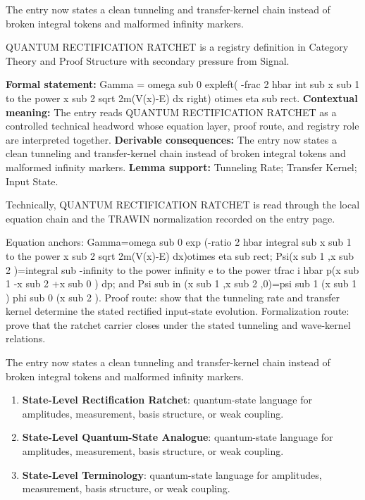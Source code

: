 The entry now states a clean tunneling and transfer-kernel chain instead of broken integral tokens and malformed infinity markers.
\clearpage


\begingroup\small
{}
QUANTUM RECTIFICATION RATCHET is a registry definition in Category Theory and Proof Structure with secondary pressure from Signal.

\begingroup\footnotesize\setlength{\emergencystretch}{3em}\sloppy
\textbf{Formal statement:} Gamma = omega sub 0 expleft( -frac 2 hbar int sub x sub 1 to the power x sub 2 sqrt 2m(V(x)-E) dx right) otimes eta sub rect. \textbf{Contextual meaning:} The entry reads QUANTUM RECTIFICATION RATCHET as a controlled technical headword whose equation layer, proof route, and registry role are interpreted together. \textbf{Derivable consequences:} The entry now states a clean tunneling and transfer-kernel chain instead of broken integral tokens and malformed infinity markers. \textbf{Lemma support:} Tunneling Rate; Transfer Kernel; Input State.\par
\endgroup

Technically, QUANTUM RECTIFICATION RATCHET is read through the local equation chain and the TRAWIN normalization recorded on the entry page.

Equation anchors: Gamma=omega sub 0 exp (-ratio 2 hbar integral sub x sub 1 to the power x sub 2 sqrt 2m(V(x)-E) dx)otimes eta sub rect; Psi(x sub 1 ,x sub 2 )=integral sub -infinity to the power infinity e to the power tfrac i hbar p(x sub 1 -x sub 2 +x sub 0 ) dp; and Psi sub in (x sub 1 ,x sub 2 ,0)=psi sub 1 (x sub 1 ) phi sub 0 (x sub 2 ). Proof route: show that the tunneling rate and transfer kernel determine the stated rectified input-state evolution. Formalization route: prove that the ratchet carrier closes under the stated tunneling and wave-kernel relations.

The entry now states a clean tunneling and transfer-kernel chain instead of broken integral tokens and malformed infinity markers.
\endgroup

\begin{enumerate}[leftmargin=1.6em,itemsep=6pt,topsep=4pt]
\item \textbf{State-Level Rectification Ratchet}: quantum-state language for amplitudes, measurement, basis structure, or weak coupling.
\item \textbf{State-Level Quantum-State Analogue}: quantum-state language for amplitudes, measurement, basis structure, or weak coupling.
\item \textbf{State-Level Terminology}: quantum-state language for amplitudes, measurement, basis structure, or weak coupling.
\end{enumerate}

